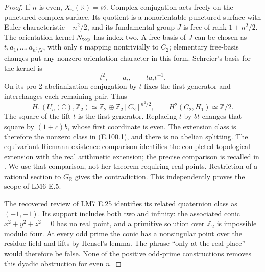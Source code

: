 \begin{proof}
If \(n\) is even, \(X_n(\mathbb R)=\varnothing\).  Complex
conjugation acts freely on the punctured complex surface.  Its
quotient is a nonorientable punctured surface with Euler
characteristic \(-n^2/2\), and its fundamental group \(J\) is free
of rank \(1+n^2/2\).  The orientation kernel \(N_{\rm top}\) has
index two.  A free basis of \(J\) can be chosen as
\(t,a_1,\ldots,a_{n^2/2}\), with only \(t\) mapping nontrivially
to \(C_2\); elementary free-basis changes put any nonzero orientation
character in this form.  Schreier's basis for the kernel is
\[
 t^2,\qquad a_i,\qquad ta_it^{-1}.
\]
On its pro-2 abelianization conjugation by \(t\) fixes the first
generator and interchanges each remaining pair.  Thus
\[
 H_1(U_n(\mathbb C),\mathbb Z_2)
   \simeq \mathbb Z_2\oplus
           \mathbb Z_2[C_2]^{n^2/2},\qquad
 H^2(C_2,H_1)\simeq\mathbb Z/2.                           \tag{E.100.1}
\]
The square of the lift \(t\) is the first generator.  Replacing
\(t\) by \(bt\) changes that square by \((1+c)b\), whose first
coordinate is even.  The extension class is therefore the nonzero
class in (E.100.1), and there is no abelian splitting.
The equivariant Riemann-existence comparison identifies the completed
topological extension with the real arithmetic extension; the precise
comparison is recalled in \citet[\S1, equation (4), author p.~3]{LitWickelgrenReal2014}.
We use that comparison, not her theorem requiring real points.
Restriction of a rational section to \(G_{\mathbb R}\) gives the
contradiction.  This independently proves the scope of LM6 E.5.

The recovered review of LM7 E.25 identifies its related quaternion
class as \((-1,-1)\).  Its support includes both two and infinity:
the associated conic \(x^2+y^2+z^2=0\) has no real point, and a
primitive solution over \(\mathbb Z_2\) is impossible modulo four.
At every odd prime the conic has a nonsingular point over the residue
field and lifts by Hensel's lemma.  The phrase ``only at the real
place'' would therefore be false.  None of the positive odd-prime
constructions removes this dyadic obstruction for even \(n\).


\end{proof}
